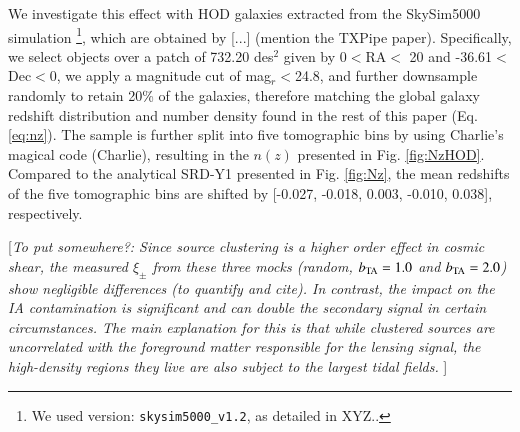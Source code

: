 \documentclass[useAMS,usenatbib]{mn2e}
\begin{document}
We investigate this effect with HOD galaxies extracted from the  SkySim5000 simulation \citep{SkySim5000_HOD} \footnote{We used version: {\tt skysim5000\_v1.2}, as detailed in XYZ..}, which are obtained by [...] (mention the TXPipe paper). Specifically, we select objects over a patch of 732.20 des$^2$ given by  0$<$RA$<$ 20 and -36.61$<$Dec$<$0, we apply a magnitude cut of mag$_r<$24.8, and further downsample randomly to retain 20\% of the galaxies, 
therefore matching the global galaxy redshift distribution and number density found in the rest of this paper (Eq. \ref{eq:nz}).  The sample is further split into five tomographic bins by using Charlie's magical code (Charlie), resulting in the $n(z)$ presented in Fig. \ref{fig:NzHOD}. Compared to the analytical SRD-Y1 presented in Fig. \ref{fig:Nz}, the mean redshifts of the five tomographic bins are shifted by [-0.027, -0.018,  0.003, -0.010,  0.038], respectively.

[{\it To put somewhere?: Since source clustering is a higher order effect in cosmic shear, the measured $\xi_{\pm}$ from these three mocks (random, $b_{\rm TA}=1.0$ and $b_{\rm TA}=2.0$) show negligible differences ({\it to quantify and cite}). In contrast, the impact on the IA contamination is significant and can double the secondary signal in certain circumstances. The main explanation for this is that while clustered sources are uncorrelated with the foreground matter responsible for the lensing signal, the high-density regions they live are also subject to the largest tidal fields. 
}]
\end{document}
